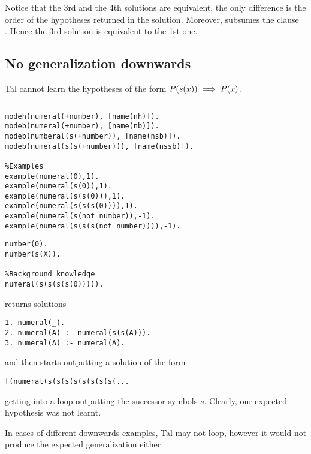 Notice that the 3rd and the 4th solutions are equivalent, the only difference is the order of the hypotheses returned in the solution. Moreover,  subsumes the clause\\
. Hence the 3rd solution is equivalent to the 1st one.

\subsection{No generalization downwards}
Tal cannot learn the hypotheses of the form $P(s(x)) \implies P (x)$.
\begin{lstlisting}

\end{lstlisting}

\begin{minipage}[t]{.65\textwidth}
\begin{lstlisting}
modeh(numeral(+number), [name(nh)]).
modeb(numeral(+number), [name(nb)]).
modeb(numberal(s(+number)), [name(nsb)]).
modeb(numeral(s(s(+number))), [name(nssb)]).

%Examples
example(numeral(0),1).
example(numeral(s(0)),1). 
example(numeral(s(s(0))),1).
example(numeral(s(s(s(0)))),1).
example(numeral(s(not_number)),-1).
example(numeral(s(s(s(not_number)))),-1).
\end{lstlisting}
\end{minipage}
\begin{minipage}[t]{.20\textwidth}
\begin{lstlisting}
number(0).
number(s(X)).

%Background knowledge
numeral(s(s(s(s(0))))).
\end{lstlisting}
\end{minipage}

returns solutions
\begin{lstlisting}
1. numeral(_).
2. numeral(A) :- numeral(s(s(A))).
3. numeral(A) :- numeral(A).
\end{lstlisting}
and then starts outputting a solution of the form
\begin{lstlisting}
[(numeral(s(s(s(s(s(s(s(s(...
\end{lstlisting}
getting into a loop outputting the successor symbols $s$. Clearly, our expected hypothesis  was not learnt.

In cases of different downwards examples, Tal may not loop, however it would not produce the expected generalization either.


